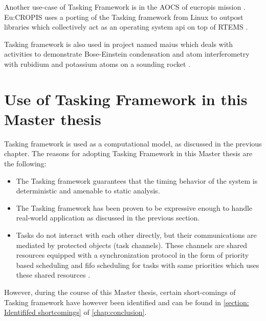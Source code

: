 Another use-case of Tasking Framework is in the AOCS of \ac{eucropis} mission \cite{TETtoEUCROPIS}. Eu:CROPIS uses a porting of the Tasking framework from Linux to outpost libraries which collectively act as an operating system \ac{api} on top of RTEMS \cite{TETtoEUCROPIS}.

Tasking framework is also used in project named \ac{maius} which deals with activities to demonstrate Bose-Einstein condensation and atom interferometry with rubidium and potassium atoms on a sounding rocket \cite{TETtoEUCROPIS}\cite{MAIUS}.

\section{Use of Tasking Framework in this Master thesis}
\label{section: Use of tasking}
Tasking framework is used as a computational model, as discussed in the previous chapter. The reasons for adopting Tasking Framework in this Master thesis are the following:

\begin{itemize}
\item The Tasking framework guarantees that the timing behavior of the system is deterministic and amenable to static analysis.
\item The Tasking framework has been proven to be expressive enough to handle real-world application as discussed in the previous section.
\item Tasks do not interact with each other directly, but their communications are mediated by protected objects (task channels). These channels are shared resources equipped with a synchronization protocol in the form of priority based scheduling and \ac{fifo} scheduling for tasks with same priorities which uses these shared resources \cite{TaskFr}.  
\end{itemize}  

However, during the course of this Master thesis, certain short-comings of Tasking framework have however been identified and can be found in \cref{section: Identififed shortcomings} of \cref{chap:conclusion}.

             



          